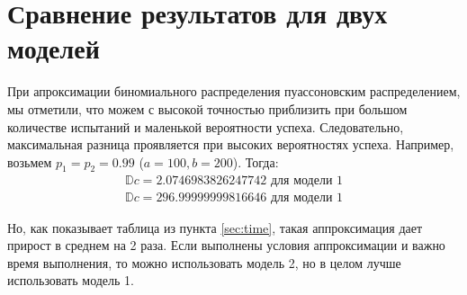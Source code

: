 \documentclass[12pt, a4paper]{article}
\begin{document}
    \section{Сравнение результатов для двух моделей}
        При апроксимации биномиального распределения пуассоновским распределением, мы отметили, что можем с высокой точностью приблизить при большом количестве испытаний и маленькой вероятности успеха. Следовательно, максимальная разница проявляется при высоких вероятностях успеха. Например, возьмем $p_1 = p_2 = 0.99$ ($a = 100, b = 200$). Тогда:
        \begin{gather}
        \mathbb{D}c = 2.0746983826247742 \text{ для модели 1}\nonumber\\
        \mathbb{D}c = 296.99999999816646 \text{ для модели 1}\nonumber
        \end{gather}

        Но, как показывает таблица из пункта \ref{sec:time}, такая аппроксимация дает прирост в среднем на 2 раза. Если выполнены условия аппроксимации и важно время выполнения, то можно использовать модель 2, но в целом лучше использовать модель 1.
\end{document}
